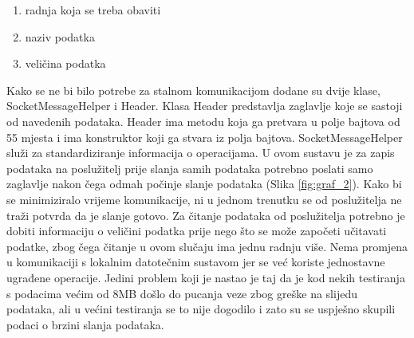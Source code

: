 \documentclass[times, utf8, zavrsni, square]{fer}
\begin{document}
\begin{enumerate}
    \itemsep0em
    \item radnja koja se treba obaviti
    \item naziv podatka
    \item veličina podatka
\end{enumerate}

Kako se ne bi bilo potrebe za stalnom komunikacijom dodane su dvije klase, SocketMessageHelper i Header.
Klasa Header predstavlja zaglavlje koje se sastoji od navedenih podataka.
Header ima metodu koja ga pretvara u polje bajtova od 55 mjesta i ima konstruktor koji ga stvara iz polja bajtova.
SocketMessageHelper služi za standardiziranje informacija o operacijama.
U ovom sustavu je za zapis podataka na poslužitelj prije slanja samih podataka potrebno poslati samo zaglavlje nakon čega odmah počinje slanje podataka (Slika \ref{fig:graf_2}).
Kako bi se minimiziralo vrijeme komunikacije, ni u jednom trenutku se od poslužitelja ne traži potvrda da je slanje gotovo.
Za čitanje podataka od poslužitelja potrebno je dobiti informaciju o veličini podatka prije nego što se može započeti učitavati podatke, zbog čega čitanje u ovom slučaju ima jednu radnju više.
Nema promjena u komunikaciji s lokalnim datotečnim sustavom jer se već koriste jednostavne ugrađene operacije.
Jedini problem koji je nastao je taj da je kod nekih testiranja s podacima većim od 8MB došlo do pucanja veze zbog greške na slijedu podataka,
ali u većini testiranja se to nije dogodilo i zato su se uspješno skupili podaci o brzini slanja podataka.
\end{document}

